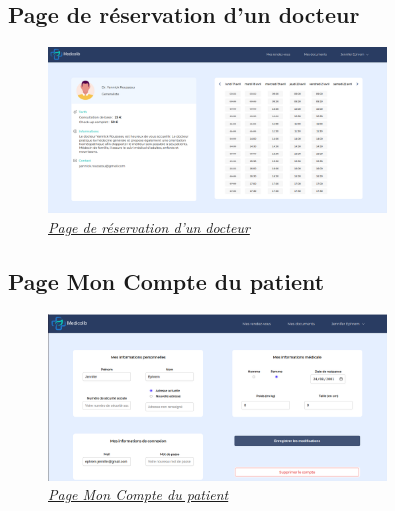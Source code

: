 \documentclass[a4paper]{report}
\begin{document}
\subsection{Page de réservation d'un docteur}
\begin{figure}[H]
    \vspace{-10pt}
    \centering
    \includegraphics[width=0.8\textwidth]{captures/page-reservation-doctor.png}
    \caption{\textit{\hyperref[docteur]{Page de réservation d'un docteur}}}
    \label{fig:DCU15}
\end{figure}

\subsection{Page Mon Compte du patient}
\begin{figure}[H]
    \vspace{-10pt}
    \centering
    \includegraphics[width=0.8\textwidth]{captures/patient-edit-account.png}
    \caption{\textit{\hyperref[edit]{Page Mon Compte du patient}}}
    \label{fig:DCU16}
\end{figure}
\end{document}
